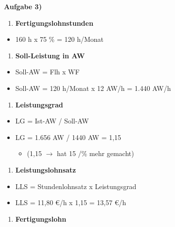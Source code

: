 \textbf{Aufgabe 3)}

\begin{enumerate}
\def\labelenumi{\alph{enumi})}
\item
  \textbf{Fertigungslohnstunden}
\end{enumerate}

\begin{itemize}
\item
  160 h x 75 \% = 120 h/Monat
\end{itemize}

\begin{enumerate}
\def\labelenumi{\alph{enumi})}
\setcounter{enumi}{1}
\item
  \textbf{Soll-Leistung in AW}
\end{enumerate}

\begin{itemize}
\item
  Soll-AW = Flh x WF
\item
  Soll-AW = 120 h/Monat x 12 AW/h = 1.440 AW/h
\end{itemize}

\begin{enumerate}
\def\labelenumi{\alph{enumi})}
\setcounter{enumi}{2}
\item
  \textbf{Leistungsgrad}
\end{enumerate}

\begin{itemize}
\item
  LG = Ist-AW / Soll-AW
\item
  LG = 1.656 AW / 1440 AW = 1,15

  \begin{itemize}
  \item
    (1,15 $\to$ hat 15 /\% mehr gemacht)
  \end{itemize}
\end{itemize}

\begin{enumerate}
\def\labelenumi{\alph{enumi})}
\setcounter{enumi}{3}
\item
  \textbf{Leistungslohnsatz}
\end{enumerate}

\begin{itemize}
\item
  LLS = Stundenlohnsatz x Leistungsgrad
\item
  LLS = 11,80 €/h x 1,15 = 13,57 €/h
\end{itemize}

\begin{enumerate}
\def\labelenumi{\alph{enumi})}
\setcounter{enumi}{4}
\item
  \textbf{Fertigungslohn}
\end{enumerate}

